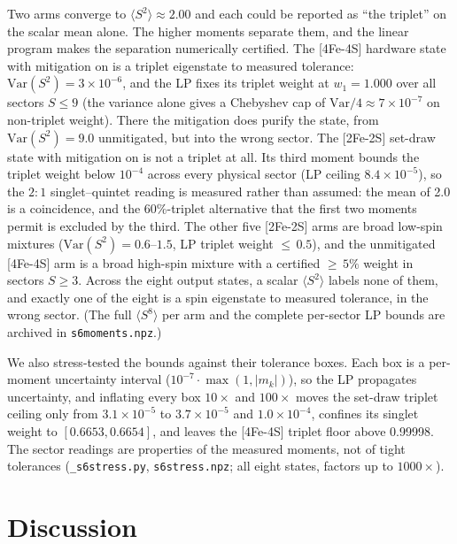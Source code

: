 \documentclass[11pt]{article}
\newcommand{\ssq}{\ensuremath{\langle S^2\rangle}}
\begin{document}
Two arms converge to $\ssq\approx2.00$ and each could be reported as ``the triplet'' on the scalar mean alone. The higher moments separate them, and the linear program makes the separation numerically certified. The [4Fe-4S] hardware state with mitigation on is a triplet eigenstate to measured tolerance: $\mathrm{Var}(S^2)=3\times10^{-6}$, and the LP fixes its triplet weight at $w_1=1.000$ over all sectors $S\le9$ (the variance alone gives a Chebyshev cap of $\mathrm{Var}/4\approx7\times10^{-7}$ on non-triplet weight). There the mitigation does purify the state, from $\mathrm{Var}(S^2)=9.0$ unmitigated, but into the wrong sector. The [2Fe-2S] set-draw state with mitigation on is not a triplet at all. Its third moment bounds the triplet weight below $10^{-4}$ across every physical sector (LP ceiling $8.4\times10^{-5}$), so the $2{:}1$ singlet--quintet reading is measured rather than assumed: the mean of 2.0 is a coincidence, and the 60\%-triplet alternative that the first two moments permit is excluded by the third. The other five [2Fe-2S] arms are broad low-spin mixtures ($\mathrm{Var}(S^2)=0.6$--$1.5$, LP triplet weight ${\le}\,0.5$), and the unmitigated [4Fe-4S] arm is a broad high-spin mixture with a certified ${\ge}\,5\%$ weight in sectors $S\ge3$. Across the eight output states, a scalar \ssq{} labels none of them, and exactly one of the eight is a spin eigenstate to measured tolerance, in the wrong sector. (The full $\langle S^8\rangle$ per arm and the complete per-sector LP bounds are archived in \texttt{s6moments.npz}.)

We also stress-tested the bounds against their tolerance boxes. Each box is a per-moment uncertainty interval ($10^{-7}\cdot\max(1, |m_k|)$), so the LP propagates uncertainty, and inflating every box $10\times$ and $100\times$ moves the set-draw triplet ceiling only from $3.1\times10^{-5}$ to $3.7\times10^{-5}$ and $1.0\times10^{-4}$, confines its singlet weight to $[0.6653, 0.6654]$, and leaves the [4Fe-4S] triplet floor above 0.99998. The sector readings are properties of the measured moments, not of tight tolerances (\texttt{\_s6stress.py}, \texttt{s6stress.npz}; all eight states, factors up to $1000\times$).

\section{Discussion}\label{sec:discussion}
\end{document}
